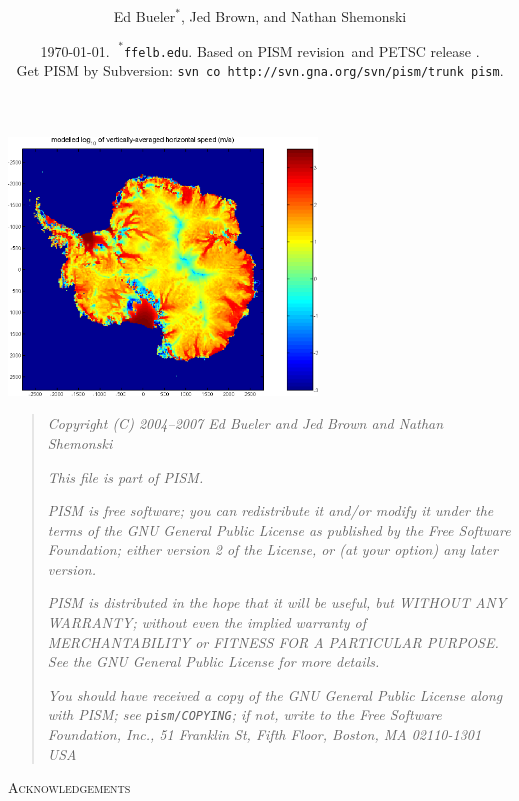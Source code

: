 \documentclass[11pt,final]{amsart}
\title[PISM User's Manual]{\protect{\Large PISM, a \underline{P}arallel \underline{I}ce \underline{S}heet \underline{M}odel:\normalsize} \\ \protect{\Large \bigskip \bigskip User's Manual\normalsize}}
\author[]{Ed $\text{Bueler}^\ast$, Jed Brown, and Nathan Shemonski}
\date{\today.  $\phantom{|}^\ast$\texttt{ffelb\@@uaf.edu}.  Based on PISM revision \PISMREV\,and PETSC release \PETSCREV.  \\\tiny Get PISM by Subversion: \texttt{svn co http://svn.gna.org/svn/pism/trunk pism}.}
\newcommand{\normalspacing}{\renewcommand{\baselinestretch}{1.1}\tiny\normalsize}
\newcommand{\tablespacing}{\renewcommand{\baselinestretch}{1.0}\tiny\normalsize}
\begin{document}
\maketitle
\thispagestyle{empty}

\vspace{2.0in}
\begin{center}
\includegraphics[height=2.7in,keepaspectratio=true]{figs/ant153k_mv100_speed}
\end{center}

\newpage
\phantom{bob}
\vspace{2in}
\begin{quote}
\textsl{Copyright (C) 2004--2007 Ed Bueler and Jed Brown and Nathan Shemonski}
\medskip

\noindent \textsl{This file is part of PISM.}
\medskip

\noindent \textsl{PISM is free software; you can redistribute it and/or modify it under the terms of the GNU General Public License as published by the Free Software Foundation; either version 2 of the License, or (at your option) any later version.}
\medskip

\noindent \textsl{PISM is distributed in the hope that it will be useful, but WITHOUT ANY WARRANTY; without even the implied warranty of MERCHANTABILITY or FITNESS FOR A PARTICULAR PURPOSE.  See the GNU General Public License for more details.}
\medskip

\noindent \textsl{You should have received a copy of the GNU General Public License along with PISM; see \emph{\texttt{pism/COPYING}}; if not, write to the Free Software Foundation, Inc., 51 Franklin St, Fifth Floor, Boston, MA  02110-1301 USA}
\end{quote}
\vspace{1in}
\normalspacing

\centerline{\textsc{Acknowledgements}}
\bigskip
\end{document}
